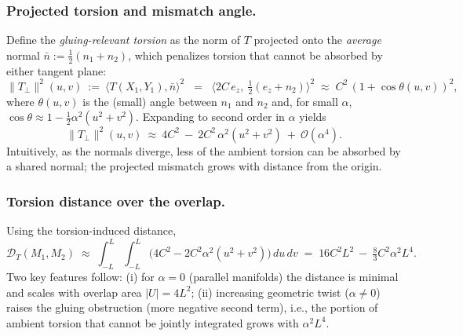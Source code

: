 \documentclass[a4paper,11pt]{article}
\begin{document}
\subsubsection{Projected torsion and mismatch angle.}
Define the \emph{gluing-relevant torsion} as the norm of $T$ projected onto the
\emph{average} normal $\bar n:=\tfrac{1}{2}(n_1+n_2)$, which penalizes torsion
that cannot be absorbed by either tangent plane:
\begin{equation}
\|T_{\perp}\|^2(u,v)\ :=\ \big\langle T(X_1,Y_1),\bar n\big\rangle^2
\;\;=\;\; \big\langle 2C\,e_z,\ \tfrac{1}{2}(e_z+n_2)\big\rangle^2
\;\approx\; C^2\,(1+\cos\theta(u,v))^2,
\end{equation}
where $\theta(u,v)$ is the (small) angle between $n_1$ and $n_2$ and, for
small $\alpha$, $\cos\theta\approx 1-\tfrac{1}{2}\alpha^2(u^2+v^2)$. Expanding
to second order in $\alpha$ yields
\begin{equation}
\|T_{\perp}\|^2(u,v)\ \approx\ 4C^2\ -\ 2C^2\,\alpha^2(u^2+v^2)\ +\ \mathcal{O}(\alpha^4).
\end{equation}
Intuitively, as the normals diverge, less of the ambient torsion can be
absorbed by a shared normal; the projected mismatch grows with distance from
the origin.

\subsubsection{Torsion distance over the overlap.}
Using the torsion-induced distance,
\begin{equation}
\mathcal{D}_T(M_1,M_2)
\;\approx\;
\int_{-L}^{L}\!\!\int_{-L}^{L} \Big(4C^2 - 2C^2\alpha^2(u^2+v^2)\Big)\,du\,dv
\;=\; 16C^2 L^2\ -\ \tfrac{8}{3}C^2\alpha^2 L^4.
\end{equation}
Two key features follow:
(i) for $\alpha=0$ (parallel manifolds) the distance is minimal and scales with
overlap area $|U|=4L^2$; (ii) increasing geometric twist ($\alpha\neq 0$)
raises the gluing obstruction (more negative second term), i.e., the portion of
ambient torsion that cannot be jointly integrated grows with $\alpha^2 L^4$.
\end{document}
